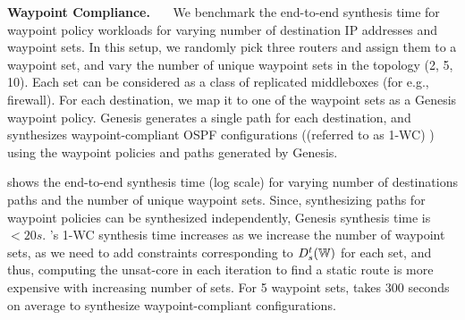 \noindent\textbf{Waypoint Compliance.}~~~
We benchmark the end-to-end synthesis time for waypoint policy 
workloads for varying number of destination IP addresses and 
waypoint sets. In this setup, we randomly pick three routers
and assign them to a waypoint set, and vary the number of 
unique waypoint sets in the topology (2, 5, 10). Each set can be 
considered as a class of replicated middleboxes (for e.g., firewall).
For each destination, we map it to one of the waypoint sets as a
Genesis waypoint policy. Genesis generates a single path for each 
destination, and \name synthesizes waypoint-compliant OSPF 
configurations ((referred to as 1-WC) ) 
using the waypoint policies and paths generated by Genesis.  

 shows the end-to-end synthesis
 time (log scale) for varying number of destinations paths and the 
 number of unique waypoint sets. Since, synthesizing paths
 for waypoint policies can be synthesized independently,
Genesis synthesis time is $<20s$. \name's 1-WC synthesis 
time increases as we increase the number of waypoint sets,
as we need to add constraints corresponding to $D_s^t(\mathbb{W})$ 
for each set, and thus, computing the unsat-core in each
iteration to find a static route is more expensive with increasing
number of sets. For 5 waypoint sets, \name takes 300 
seconds on average to synthesize waypoint-compliant configurations. 



